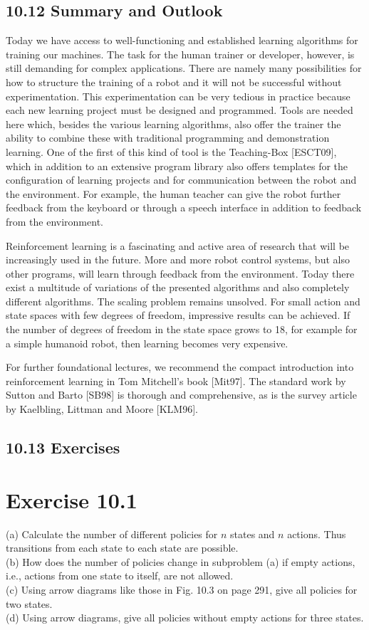 \documentclass[10pt]{article}
\begin{document}
\subsection*{10.12 Summary and Outlook}
Today we have access to well-functioning and established learning algorithms for training our machines. The task for the human trainer or developer, however, is still demanding for complex applications. There are namely many possibilities for how to structure the training of a robot and it will not be successful without experimentation. This experimentation can be very tedious in practice because each new learning project must be designed and programmed. Tools are needed here which, besides the various learning algorithms, also offer the trainer the ability to combine these with traditional programming and demonstration learning. One of the first of this kind of tool is the Teaching-Box [ESCT09], which in addition to an extensive program library also offers templates for the configuration of learning projects and for communication between the robot and the environment. For example, the human teacher can give the robot further feedback from the keyboard or through a speech interface in addition to feedback from the environment.


Reinforcement learning is a fascinating and active area of research that will be increasingly used in the future. More and more robot control systems, but also other programs, will learn through feedback from the environment. Today there exist a multitude of variations of the presented algorithms and also completely different algorithms. The scaling problem remains unsolved. For small action and state spaces with few degrees of freedom, impressive results can be achieved. If the number of degrees of freedom in the state space grows to 18, for example for a simple humanoid robot, then learning becomes very expensive.

For further foundational lectures, we recommend the compact introduction into reinforcement learning in Tom Mitchell's book [Mit97]. The standard work by Sutton and Barto [SB98] is thorough and comprehensive, as is the survey article by Kaelbling, Littman and Moore [KLM96].

\subsection*{10.13 Exercises}
\section*{Exercise 10.1}
(a) Calculate the number of different policies for $n$ states and $n$ actions. Thus transitions from each state to each state are possible.\\
(b) How does the number of policies change in subproblem (a) if empty actions, i.e., actions from one state to itself, are not allowed.\\
(c) Using arrow diagrams like those in Fig. 10.3 on page 291, give all policies for two states.\\
(d) Using arrow diagrams, give all policies without empty actions for three states.
\end{document}
